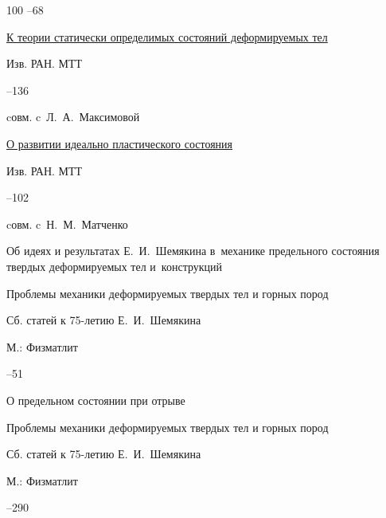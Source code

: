 \begin{thebibliography}{100}
--68




\paper \href{http://elibrary.ru/item.asp?id=9282200}{К теории статически определимых состояний деформируемых тел}

\jour Изв. РАН. МТТ



–136 

\miscnote cовм. c~Л.~А.~Максимовой





\paper \href{http://elibrary.ru/item.asp?id=9438851}{О развитии идеально пластического состояния}

\jour Изв. РАН. МТТ



–102

\miscnote cовм. c~Н.~М.~Матченко











\paper Об идеях и результатах Е.~И.~Шемякина в~механике предельного состояния твердых деформируемых тел и~конструкций 

\inbook Проблемы механики деформируемых твердых тел и горных пород

\bookinfo Сб. статей к 75-летию Е.~И.~Шемякина

\publaddr М.: Физматлит


–51






\paper О предельном состоянии при отрыве 

\inbook Проблемы механики деформируемых твердых тел и горных пород

\bookinfo Сб. статей к 75-летию Е.~И.~Шемякина

\publaddr М.: Физматлит


–290 


\end{thebibliography}
